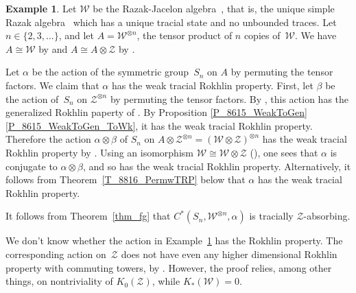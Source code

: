 \documentclass[11pt]{amsart}
\theoremstyle{plain}
\theoremstyle{definition}
\newtheorem{example}[theorem]{Example}
\theoremstyle{remark}
\numberwithin{equation}{section}
\newcommand{\af}{\alpha}
\newcommand{\bt}{\beta}
\begin{document}
\begin{example}\label{E_8703_WShift}
Let $\mathcal{W}$ be the Razak-Jacelon algebra~\cite{Jcln},
that is, the unique simple Razak algebra~\cite{Rzk}
which has a unique tracial state and no unbounded traces.
Let $n \in \{ 2, 3, \ldots \}$,
and let $A = \mathcal{W}^{\otimes n}$,
the tensor product of $n$ copies of~$\mathcal{W}$.
We have $A \cong \mathcal{W}$ by \cite[Corollary 19.3]{GngLin}
and $A \cong A \otimes {\mathcal{Z}}$ by \cite[Corollary 6.3]{Jcln}.

Let $\af$ be the action of the symmetric group~$S_n$
on $A$ by permuting the tensor factors.
We claim that $\af$ has the weak tracial Rokhlin property.
First, let $\bt$ be the action of~$S_n$
on ${\mathcal{Z}}^{\otimes n}$ by permuting the tensor factors.
By \cite[Example 5.10]{HO13},
this action has the generalized Rokhlin paperty
of \cite[Definition 5.2]{HO13}.
By Proposition \ref{P_8615_WeakToGen}\ref{P_8615_WeakToGen_ToWk},
it has the weak tracial Rokhlin property.
Therefore the action $\af \otimes \bt$
of $S_n$ on
$A \otimes {\mathcal{Z}}^{\otimes n}
 = (\mathcal{W} \otimes {\mathcal{Z}})^{\otimes n}$
has the weak tracial Rokhlin property
by \cite[Proposition 4.5]{FG17}.
Using an isomorphism $\mathcal{W} \cong \mathcal{W} \otimes {\mathcal{Z}}$
(\cite[Corollary 6.3]{Jcln}),
one sees that $\af$ is conjugate to $\af \otimes \bt$,
and so has the weak tracial Rokhlin property.
Alternatively, it follows from Theorem~\ref{T_8816_PermwTRP} below 
that $\af$ has the weak tracial Rokhlin property.

It follows from Theorem~\ref{thm_fg}
that $C^* (S_n, \mathcal{W}^{\otimes n}, \af)$
is tracially $\mathcal{Z}$-absorbing.
\end{example}

We don't know whether the action in Example~\ref{E_8703_WShift}
has the Rokhlin property.
The corresponding action on~${\mathcal{Z}}$
does not have even any higher dimensional Rokhlin property
with commuting towers,
by \cite[Corollary 4.8]{HrsPh1}.
However,
the proof relies,
among other things, on nontriviality of $K_0 ( {\mathcal{Z}} )$,
while $K_* (\mathcal{W}) = 0$.
\end{document}
